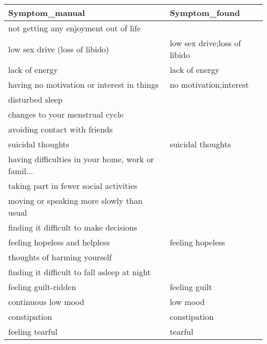 \begin{table}
\begin{center}
\begin{tabular}{ll}
\toprule
                                    Symptom\_manual &                 Symptom\_found \\
\midrule
             not getting any enjoyment out of life &                               \\
                    low sex drive (loss of libido) &  low sex drive;loss of libido \\
                                    lack of energy &                lack of energy \\
        having no motivation or interest in things &        no motivation;interest \\
                                   disturbed sleep &                               \\
                   changes to your menstrual cycle &                               \\
                     avoiding contact with friends &                               \\
                                 suicidal thoughts &             suicidal thoughts \\
having difficulties in your home, work or famil... &                               \\
            taking part in fewer social activities &                               \\
         moving or speaking more slowly than usual &                               \\
            finding it difficult to make decisions &                               \\
                     feeling hopeless and helpless &              feeling hopeless \\
                      thoughts of harming yourself &                               \\
      finding it difficult to fall asleep at night &                               \\
                              feeling guilt-ridden &                 feeling guilt \\
                               continuous low mood &                      low mood \\
                                      constipation &                  constipation \\
                                   feeling tearful &                       tearful \\

\end{tabular}
\end{center}
\end{table}

